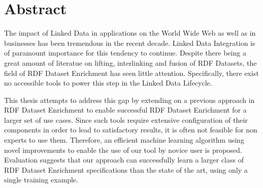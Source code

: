 \begingroup
\let\clearpage\relax
\let\cleardoublepage\relax
\let\cleardoublepage\relax

\chapter*{Abstract}
The impact of Linked Data in applications on the World Wide Web as well as in businesses has been tremendous in the recent decade.
Linked Data Integration is of paramount importance for this tendency to continue.
Despite there being a great amount of literatue on lifting, interlinking and fusion of RDF Datasets, the field of RDF Dataset Enrichment has seen little attention.
Specifically, there exist no accessible tools to power this step in the Linked Data Lifecycle.

This thesis attempts to address this gap by extending on a previous approach in RDF Dataset Enrichment to enable successful RDF Dataset Enrichment for a larger set of use cases.
Since such tools require extensive configuration of their components in order to lead to satisfactory results, it is often not feasible for non experts to use them.
Therefore, an efficient machine learning algorithm using novel improvements to enable the use of our tool by novice user is proposed.
Evaluation suggests that our approach can successfully learn a larger class of RDF Dataset Enrichment specifications than the state of the art, using only a single training example.

\newpage

